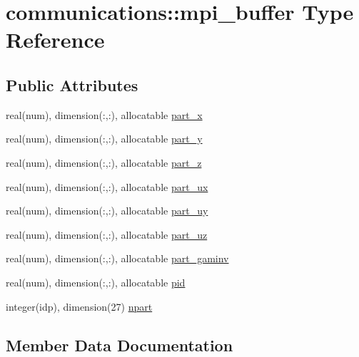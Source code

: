 \hypertarget{structcommunications_1_1mpi__buffer}{}\section{communications\+:\+:mpi\+\_\+buffer Type Reference}
\label{structcommunications_1_1mpi__buffer}
\subsection*{Public Attributes}
\begin{DoxyCompactItemize}
\item 
real(num), dimension(\+:,\+:), allocatable \hyperlink{structcommunications_1_1mpi__buffer_aed18adf8c3a69daffdd13bf6aa60394e}{part\+\_\+x}
\item 
real(num), dimension(\+:,\+:), allocatable \hyperlink{structcommunications_1_1mpi__buffer_a850286d845a4841a579f0da6a7dd7535}{part\+\_\+y}
\item 
real(num), dimension(\+:,\+:), allocatable \hyperlink{structcommunications_1_1mpi__buffer_a43ae1af260d9ea102f916f38916003aa}{part\+\_\+z}
\item 
real(num), dimension(\+:,\+:), allocatable \hyperlink{structcommunications_1_1mpi__buffer_afa60bf7fcef056b664ed688c9d7d736d}{part\+\_\+ux}
\item 
real(num), dimension(\+:,\+:), allocatable \hyperlink{structcommunications_1_1mpi__buffer_aaba8d571a2270f6e422998b81cb7b9b2}{part\+\_\+uy}
\item 
real(num), dimension(\+:,\+:), allocatable \hyperlink{structcommunications_1_1mpi__buffer_a223fe5728cf714d3e761e279511f54c5}{part\+\_\+uz}
\item 
real(num), dimension(\+:,\+:), allocatable \hyperlink{structcommunications_1_1mpi__buffer_a5269b5773a65cac43ab6bb0e6bdebda5}{part\+\_\+gaminv}
\item 
real(num), dimension(\+:,\+:), allocatable \hyperlink{structcommunications_1_1mpi__buffer_ac44e9695ac6a3e8b0bec14e3293f7c34}{pid}
\item 
integer(idp), dimension(27) \hyperlink{structcommunications_1_1mpi__buffer_ae12cdbaa74e3fa8740d28052c0183471}{npart}
\end{DoxyCompactItemize}


\subsection{Member Data Documentation}
